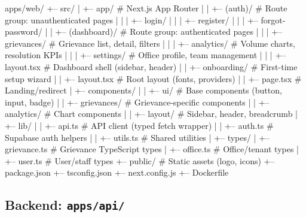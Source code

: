 \documentclass[12pt, a4paper]{article}
\begin{document}
\begin{treebox}
apps/web/
+-- src/
|   +-- app/                         # Next.js App Router
|   |   +-- (auth)/                  # Route group: unauthenticated pages
|   |   |   +-- login/
|   |   |   +-- register/
|   |   |   +-- forgot-password/
|   |   +-- (dashboard)/             # Route group: authenticated pages
|   |   |   +-- grievances/          # Grievance list, detail, filters
|   |   |   +-- analytics/           # Volume charts, resolution KPIs
|   |   |   +-- settings/            # Office profile, team management
|   |   |   +-- layout.tsx           # Dashboard shell (sidebar, header)
|   |   +-- onboarding/              # First-time setup wizard
|   |   +-- layout.tsx               # Root layout (fonts, providers)
|   |   +-- page.tsx                 # Landing/redirect
|   +-- components/
|   |   +-- ui/                      # Base components (button, input, badge)
|   |   +-- grievances/              # Grievance-specific components
|   |   +-- analytics/               # Chart components
|   |   +-- layout/                  # Sidebar, header, breadcrumb
|   +-- lib/
|   |   +-- api.ts                   # API client (typed fetch wrapper)
|   |   +-- auth.ts                  # Supabase auth helpers
|   |   +-- utils.ts                 # Shared utilities
|   +-- types/
|       +-- grievance.ts             # Grievance TypeScript types
|       +-- office.ts                # Office/tenant types
|       +-- user.ts                  # User/staff types
+-- public/                          # Static assets (logo, icons)
+-- package.json
+-- tsconfig.json
+-- next.config.js
+-- Dockerfile
\end{treebox}

\subsection{Backend: \texttt{apps/api/}}
\end{document}
